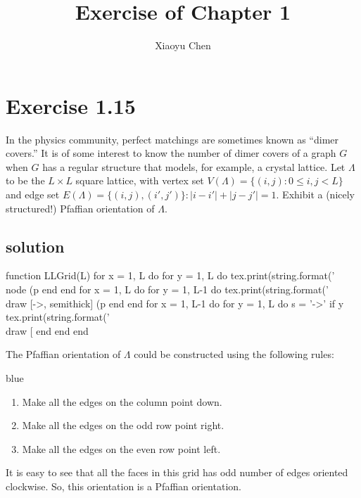 \documentclass{article}
\title{Exercise of Chapter 1}
\author{Xiaoyu Chen}
\date{}
\begin{document}
\maketitle
\section{Exercise 1.15}
In the physics community, perfect matchings are sometimes known as ``dimer covers.'' It is of some interest to know the number of dimer covers of a graph $G$ when $G$ has a regular structure that models, for example, a crystal lattice. Let $\Lambda$ to be the $L\times L$ square lattice, with vertex set $V(\Lambda) = \{(i, j) : 0 \leq i, j < L\}$ and edge set $E(\Lambda) = \{(i, j), (i', j')\} : |i - i'| + |j - j'| = 1$. Exhibit a (nicely structured!) Pfaffian orientation of $\Lambda$.
\subsection{solution}
\begin{luacode*}
  function LLGrid(L)
    for x = 1, L do
      for y = 1, L do
        tex.print(string.format('\\node (p%
      end
    end
    for x = 1, L do
      for y = 1, L-1 do
        tex.print(string.format('\\draw [->, semithick] (p%
      end
    end
    for x = 1, L-1 do
      for y = 1, L do
        s = '->'
        if y %
        tex.print(string.format('\\draw [%
      end
    end
  end
\end{luacode*}
The Pfaffian orientation of $\Lambda$ could be constructed using the following rules:
\begin{mybox}{blue}{}
\begin{enumerate}[nosep]
    \item Make all the edges on the column point down.
    \item Make all the edges on the odd row point right.
    \item Make all the edges on the even row point left.
\end{enumerate}
\begin{center}
\end{center}
\end{mybox}
It is easy to see that all the faces in this grid has odd number of edges oriented clockwise.
So, this orientation is a Pfaffian orientation.
\end{document}
